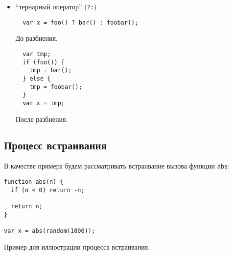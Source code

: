 \begin{enumerate}
\begin{itemize}
  \item ``тернарный оператор'' (\texttt{?:})
  \begin{listing}[H]
  \begin{verbatim}
  var x = foo() ? bar() : foobar();
  \end{verbatim}
  \caption{До разбиения.}
  \end{listing}

  \begin{listing}[H]
  \begin{verbatim}
  var tmp;
  if (foo()) {
    tmp = bar();
  } else {
    tmp = foobar();
  }
  var x = tmp;
  \end{verbatim}
  \caption{После разбиения.}
  \end{listing}

  \end{itemize}
\end{enumerate}

\subsection{Процесс встраивания}

В качестве примера будем рассматривать встраивание
вызова функции \texttt{abs}:
\begin{listing}[H]
\begin{verbatim}
function abs(n) {
  if (n < 0) return -n;

  return n;
}

var x = abs(random(1000));
\end{verbatim}
\caption{Пример для иллюстрации процесса встраивания.}
\end{listing}

